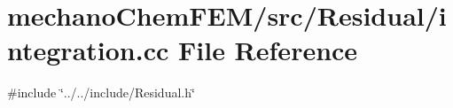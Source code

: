 \section{mechano\+Chem\+F\+E\+M/src/\+Residual/integration.cc File Reference}
\label{integration_8cc}
{\ttfamily \#include \char`\"{}../../include/\+Residual.\+h\char`\"{}}\newline
